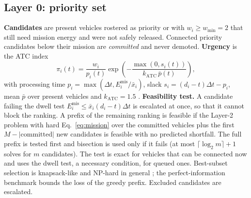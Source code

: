 \documentclass[preprint,12pt]{elsarticle}
\newcommand{\Mis}{E^{\mathrm{mis}}}
\begin{document}
\subsection{Layer 0: priority set}
\label{sec:layer0}
\textbf{Candidates} are present vehicles rostered as priority or with $w_i\ge w_{\min}=2$ that still need
mission energy and were not safely released. Connected priority candidates below their mission are
\emph{committed} and never demoted. \textbf{Urgency} is the ATC index \cite{vepsalainen1987priority}
\begin{equation}
  \pi_i(t)=\frac{w_i}{p_i(t)}\exp\!\left(-\frac{\max(0,s_i(t))}{k_{\mathrm{ATC}}\,\bar{p}(t)}\right),
  \label{eq:atc}
\end{equation}
with processing time $p_i=\max(\Delta t,\Mis_i/\bar{x}_i)$, slack $s_i=(d_i-t)\Delta t-p_i$, mean $\bar{p}$ over
present vehicles and $k_{\mathrm{ATC}}=1.5$ \cite{valente2007heuris}. \textbf{Feasibility test.} A candidate
failing the dwell test $\Mis_i\le\bar{x}_i(d_i-t)\Delta t$ is escalated at once, so that it cannot block the
ranking. A prefix of the remaining ranking is feasible if the Layer-2 problem with hard
Eq.~\eqref{eq:mission} over the committed vehicles plus the first $M-|\text{committed}|$ new candidates is
feasible with no predicted shortfall. The full prefix is tested first and bisection is used only if it
fails (at most $\lceil\log_2m\rceil+1$ solves for $m$ candidates). The test is exact for vehicles that can be
connected now and uses the dwell test, a necessary condition, for queued ones. Best-subset selection is
knapsack-like and NP-hard in general \cite{kellerer2004knapsack}; the perfect-information benchmark bounds
the loss of the greedy prefix. Excluded candidates are escalated.
\end{document}
